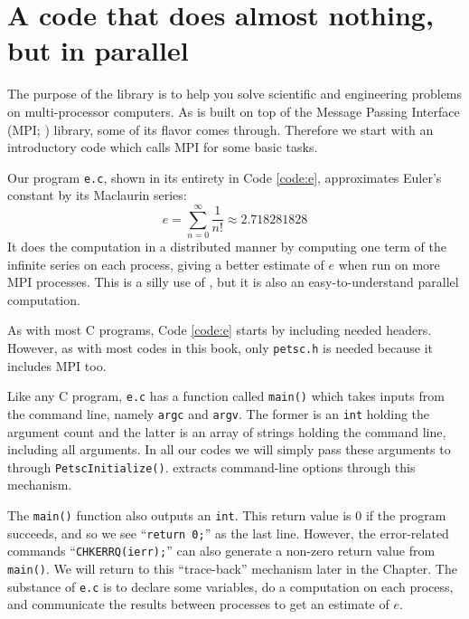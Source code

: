 
\section{A code that does almost nothing, but in parallel}

The purpose of the \PETSc library is to help you solve scientific and engineering problems on multi-processor computers.  As \PETSc is built on top of the Message Passing Interface (MPI; \citep{Groppetal1999}) library, some of its flavor comes through.  Therefore we start with an introductory \PETSc code which calls MPI for some basic tasks.

Our program \texttt{e.c}, shown in its entirety in Code \ref{code:e}, approximates Euler's constant by its Maclaurin series:
\begin{equation}
e = \sum_{n = 0}^\infty \frac{1}{n!} \approx 2.718281828 \label{eq:gs:introseries}
\end{equation}
It does the computation in a distributed manner by computing one term of the infinite series on each process, giving a better estimate of $e$ when run on more MPI processes. This is a silly use of \PETSc, but it is also an easy-to-understand parallel computation.

As with most C programs, Code \ref{code:e} starts by including needed headers.  However, as with most codes in this book, only \texttt{petsc.h} is needed because it includes MPI too.

Like any C program, \texttt{e.c} has a function called \texttt{main()} which takes inputs from the command line, namely \texttt{argc} and \texttt{argv}.  The former is an \texttt{int} holding the argument count and the latter is an array of strings holding the command line, including all arguments.  In all our codes we will simply pass these arguments to \PETSc through \texttt{PetscInitialize()}.  \PETSc extracts command-line options through this mechanism.

The \texttt{main()} function also outputs an \texttt{int}.  This return value is $0$ if the program succeeds, and so we see ``\texttt{return 0;}'' as the last line.  However, the error-related commands ``\texttt{CHKERRQ(ierr);}'' can also generate a non-zero return value from \texttt{main()}.  We will return to this ``trace-back'' mechanism later in the Chapter.  The substance of \texttt{e.c} is to declare some variables, do a computation on each process, and communicate the results between processes to get an estimate of $e$.


